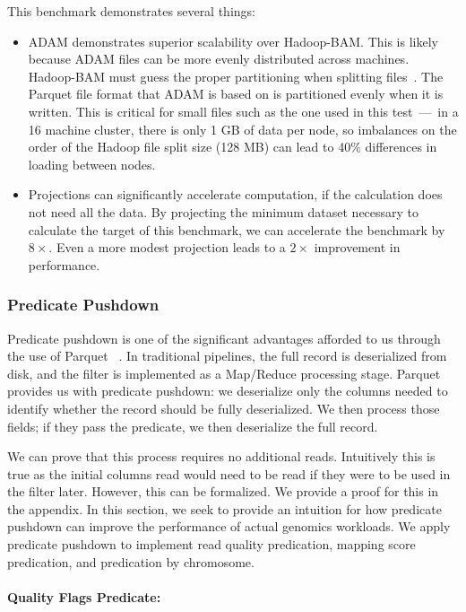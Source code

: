 \documentclass[10pt,twocolumn]{article}
\theoremstyle{plain}
\begin{document}
This benchmark demonstrates several things:

\begin{itemize}
\item ADAM demonstrates superior scalability over Hadoop-BAM. This is likely because ADAM files can be more evenly distributed across machines.
Hadoop-BAM must guess the proper partitioning when splitting files~\cite{niemenmaa12}. The Parquet file format that ADAM is based on is partitioned
evenly when it is written\cite{parquet}. This is critical for small files such as the one used in this test~---~in a 16 machine cluster, there is only 1 GB of
data per node, so imbalances on the order of the Hadoop file split size (128 MB) can lead to 40\% differences in loading between nodes.
\item Projections can significantly accelerate computation, if the calculation does not need all the data. By projecting the minimum dataset necessary
to calculate the target of this benchmark, we can accelerate the benchmark by $8\times$. Even a more modest projection leads to a $2\times$
improvement in performance.
\end{itemize}

\subsubsection{Predicate Pushdown}
\label{sec:predicate-pushdown}

Predicate pushdown is one of the significant advantages afforded to us through the use of Parquet	~\cite{parquet}. In traditional
pipelines, the full record is deserialized from disk, and the filter is implemented as a Map/Reduce processing stage. Parquet provides
us with predicate pushdown: we deserialize only the columns needed to identify whether the record should be fully deserialized. We
then process those fields; if they pass the predicate, we then deserialize the full record.

We can prove that this process requires no additional reads. Intuitively this is true as the initial columns read would need to be read
if they were to be used in the filter later. However, this can be formalized. We provide a proof for this in the appendix.
In this section, we seek to provide an intuition for how predicate pushdown can improve the performance of actual genomics workloads.
We apply predicate pushdown to implement read quality predication, mapping score predication, and predication by chromosome. 

\paragraph{Quality Flags Predicate:}
\label{sec:quality-flags-predicate}
\end{document}
